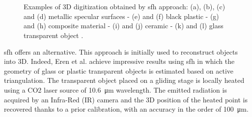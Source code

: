 \begin{figure}
  \centering
  \hspace*{\fill}
   \hfill
   \hfill
   \hfill
  \hspace*{\fill} \\ \hspace*{\fill}
   \hfill
   \hfill
   \hfill
  \hspace*{\fill} \\ \hspace*{\fill}
   \hfill
   \hfill
   \hfill
  \hspace*{\fill}
  \caption{Examples of 3D digitization obtained by \acs*{sfh} approach: (a), (b), (c) and (d) metallic specular surfaces \cite{bajard2013numerisation} - (e) and (f) black plastic - (g) and (h) composite material - (i) and (j) ceramic - (k) and (l) glass transparent object \cite{meriaudeau20113d}.}
  \label{fig:1}
\end{figure}


\ac{sfh} offers an alternative. This approach is initially used to reconstruct objects into 3D. Indeed, Eren et al.\cite{Eren2009} achieve impressive results using \ac{sfh} in which the geometry of glass or plastic transparent objects is estimated based on active triangulation. The transparent object placed on a gliding stage is locally heated using a CO2 laser source of \SI{10.6}{\micro \metre} wavelength. The emitted radiation is acquired by an Infra-Red (IR) camera and the 3D position of the heated point is recovered thanks to a prior calibration, with an accuracy in the order of \SI{100}{\micro \metre}.

